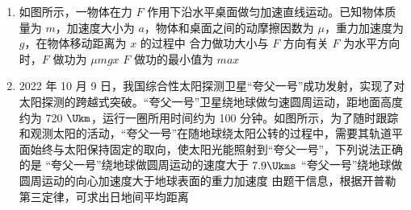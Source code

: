 \documentclass[\gkver]{gaokaozhenti}
\begin{document}
\begin{enumerate}
{C．若误将 $n -$ 1 圈记作 $n$ 圈，则得到的质量偏小，故 C 错误；

D．若测 $R$ 时未计入小球的半径，则 $R$ 偏小，所测质量偏大，故 D 错误。

故选 A。
}

\item
如图所示，一物体在力 $F$ 作用下沿水平桌面做匀加速直线运动。已知物体质量为 $m$，加速度大小为 $a$，物体和桌面之间的动摩擦因数为 $\mu$，重力加速度为 $g$，在物体移动距离为 $x$ 的过程中
\onepicture[w=3.26cm]{}
{合力做功大小与 $F$ 方向有关}
{$F$ 为水平方向时，$F$ 做功为 $\mu mgx$}
{$F$ 做功的最小值为 $max$}

\item
2022 年 10 月 9 日，我国综合性太阳探测卫星“夸父一号”成功发射，实现了对太阳探测的跨越式突破。“夸父一号”卫星绕地球做匀速圆周运动，距地面高度约为 720 $\Ukm$，运行一圈所用时间约为 100 分钟。如图所示，为了随时跟踪和观测太阳的活动，“夸父一号”在随地球绕太阳公转的过程中，需要其轨道平面始终与太阳保持固定的取向，使太阳光能照射到“夸父一号”，下列说法正确的是
{“夸父一号”绕地球做圆周运动的速度大于 $7.9 \Ukms$}
{“夸父一号”绕地球做圆周运动的向心加速度大于地球表面的重力加速度}
{由题干信息，根据开普勒第三定律，可求出日地间平均距离}
\end{enumerate}
\end{document}
